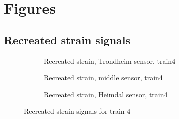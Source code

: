 %
%
\newpage
\chapter{Figures}
%
\section{Recreated strain signals}
\label{appendix:recreated_signals}
\begin{figure}[h]
  \begin{subfigure}[t]{0.9\textwidth}
    \centering
    
    \caption{Recreated strain, Trondheim sensor, train4} %
    \label{recreated_sensor_trond_train4}
  \end{subfigure}
%
  \begin{subfigure}[t]{0.9\textwidth}
    \centering
    
    \caption{Recreated strain, middle sensor, train4} %
    \label{recreated_sensor_middle_train4}
  \end{subfigure}
%
  \begin{subfigure}[t]{0.9\textwidth}
    \centering
    
    \caption{Recreated strain, Heimdal sensor, train4} %
    \label{recreated_sensor_heimdal_train4}
  \end{subfigure}
%
  \caption{Recreated strain signals for train 4}
  \label{fig:recreated_strains_train4}
\end{figure}


